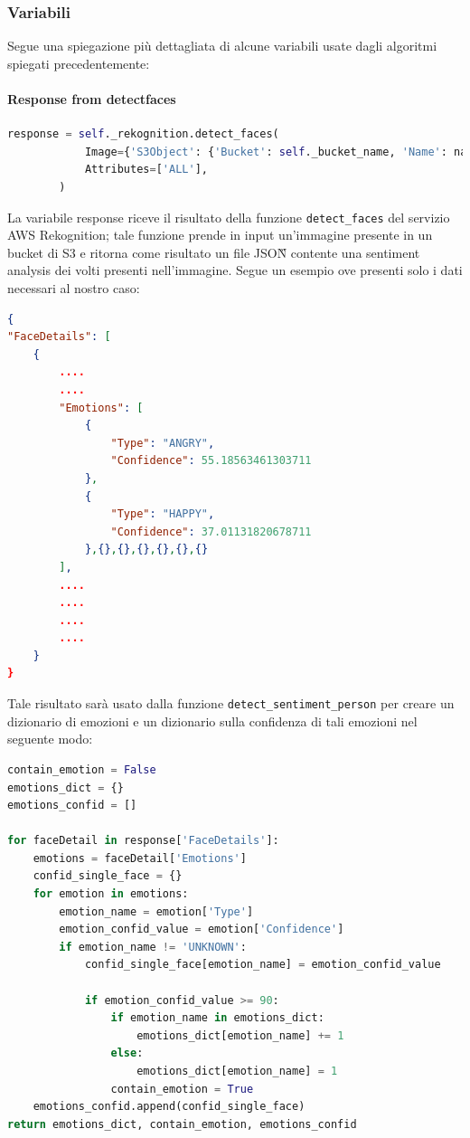 \subsubsection{Variabili}
Segue una spiegazione più dettagliata di alcune variabili usate dagli algoritmi spiegati precedentemente:
\paragraph{Response from detect\textunderscore{}faces} \aCapo{}
\begin{lstlisting}[language=Python]
response = self._rekognition.detect_faces(
            Image={'S3Object': {'Bucket': self._bucket_name, 'Name': name_image}},
            Attributes=['ALL'],
        )
\end{lstlisting}
La variabile response riceve il risultato della funzione \verb+detect_faces+ del servizio AWS Rekognition; tale funzione prende in input un'immagine presente in un bucket di S3 e ritorna come risultato un file JSON\G{} contente  una sentiment analysis dei volti presenti nell'immagine. Segue un esempio ove presenti solo i dati necessari al nostro caso:
\begin{lstlisting}[language=JSON]
{
"FaceDetails": [
    {
    	....
    	....
        "Emotions": [
            {
                "Type": "ANGRY",
                "Confidence": 55.18563461303711
            },
            {
                "Type": "HAPPY",
                "Confidence": 37.01131820678711
            },{},{},{},{},{},{}
        ],
        ....
        ....
        ....
        ....
    }
}
\end{lstlisting}
Tale risultato sarà usato dalla funzione \verb+detect_sentiment_person+ per creare  un dizionario di emozioni e
un dizionario sulla confidenza di tali emozioni nel seguente modo:
\begin{lstlisting}[language=Python]
contain_emotion = False
emotions_dict = {}
emotions_confid = []

for faceDetail in response['FaceDetails']:
    emotions = faceDetail['Emotions']
    confid_single_face = {}
    for emotion in emotions:
        emotion_name = emotion['Type']
        emotion_confid_value = emotion['Confidence']
        if emotion_name != 'UNKNOWN':
            confid_single_face[emotion_name] = emotion_confid_value

            if emotion_confid_value >= 90:
                if emotion_name in emotions_dict:
                    emotions_dict[emotion_name] += 1
                else:
                    emotions_dict[emotion_name] = 1
                contain_emotion = True
    emotions_confid.append(confid_single_face)
return emotions_dict, contain_emotion, emotions_confid
\end{lstlisting}
